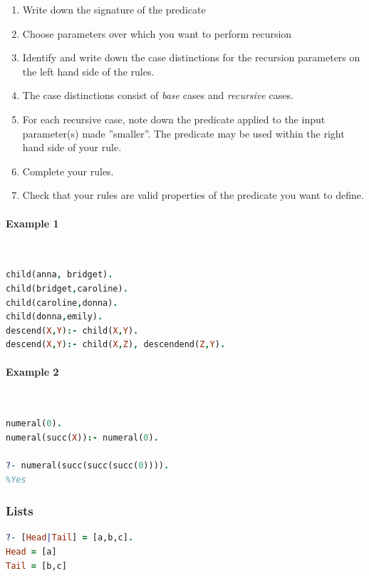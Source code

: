 \begin{enumerate}
	\item Write down the signature of the predicate
	\item Choose parameters over which you want to perform recursion
	\item Identify and write down the case distinctions for the recursion parameters on the left hand side of the rules.
	\item The case distinctions consist of \emph{base} cases and \emph{recursive} cases.
	\item For each recursive case, note down the predicate applied to the input parameter(s) made ''smaller''. The predicate may be used within the right hand side of your rule.
	\item Complete your rules.
	\item Check that your rules are valid properties of the predicate you want to define.
\end{enumerate}

\paragraph{Example 1} \hfill \\

\begin{lstlisting}[language=Prolog]
child(anna, bridget).
child(bridget,caroline).
child(caroline,donna).
child(donna,emily).
descend(X,Y):- child(X,Y).
descend(X,Y):- child(X,Z), descendend(Z,Y).
\end{lstlisting}

\paragraph{Example 2} \hfill \\

\begin{lstlisting}[language=Prolog]
numeral(0).
numeral(succ(X)):- numeral(0).

?- numeral(succ(succ(succ(0)))).
%Yes
\end{lstlisting}

\subsubsection{Lists}

\begin{lstlisting}[language=Prolog]
?- [Head|Tail] = [a,b,c].
Head = [a]
Tail = [b,c]
\end{lstlisting}


